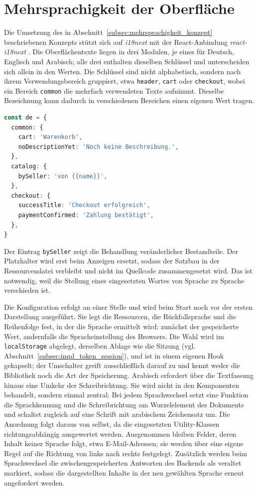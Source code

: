 \section{Mehrsprachigkeit der Oberfläche}
\label{sec:impl_i18n}

Die Umsetzung des in
Abschnitt~\ref{subsec:mehrsprachigkeit_konzept} beschriebenen
Konzepts stützt sich auf \textit{i18next} mit der React-Anbindung
\textit{react-i18next} \cite{i18next_docs}. Die Oberflächentexte liegen in drei Modulen, je eines für Deutsch,
Englisch und Arabisch; alle drei enthalten dieselben Schlüssel und unterscheiden sich allein in den
Werten. Die Schlüssel sind nicht alphabetisch, sondern nach ihrem
Verwendungsbereich gruppiert, etwa \texttt{header}, \texttt{cart}
oder \texttt{checkout}, wobei ein Bereich \texttt{common} die
mehrfach verwendeten Texte aufnimmt. Dieselbe Bezeichnung kann
dadurch in verschiedenen Bereichen einen eigenen Wert tragen.

\begin{lstlisting}[language=TypeScript,caption={Auszug aus der deutschen Ressourcendatei (de.ts)},label={lst:i18n-messages}]
const de = {
  common: {
    cart: 'Warenkorb',
    noDescriptionYet: 'Noch keine Beschreibung.',
  },
  catalog: {
    bySeller: 'von {{name}}',
  },
  checkout: {
    successTitle: 'Checkout erfolgreich',
    paymentConfirmed: 'Zahlung bestätigt',
  },
}
\end{lstlisting}

Der Eintrag \texttt{bySeller} zeigt die Behandlung veränderlicher
Bestandteile. Der Platzhalter wird erst beim Anzeigen ersetzt, sodass
der Satzbau in der Ressourcendatei verbleibt und nicht im Quellcode
zusammengesetzt wird. Das ist notwendig, weil die Stellung eines
eingesetzten Wortes von Sprache zu Sprache verschieden ist.

Die Konfiguration erfolgt an einer Stelle und wird beim Start noch
vor der ersten Darstellung ausgeführt. Sie legt die Ressourcen, die
Rückfallsprache und die Reihenfolge fest, in der die Sprache
ermittelt wird: zunächst der gespeicherte Wert, andernfalls die
Spracheinstellung des Browsers. Die Wahl wird im
\texttt{localStorage} abgelegt, derselben Ablage wie die Sitzung
(vgl. Abschnitt~\ref{subsec:impl_token_session}), und ist in einem
eigenen Hook gekapselt; der Umschalter greift ausschließlich darauf
zu und kennt weder die Bibliothek noch die Art der Speicherung.
Arabisch erfordert über die Textfassung hinaus eine Umkehr der
Schreibrichtung. Sie wird nicht in den Komponenten behandelt, sondern
einmal zentral: Bei jedem Sprachwechsel setzt eine Funktion die
Sprachkennung und die Schreibrichtung am Wurzelelement des Dokuments
und schaltet zugleich auf eine Schrift mit arabischem Zeichensatz um.
Die Anordnung folgt daraus von selbst, da die eingesetzten
Utility-Klassen richtungsabhängig ausgewertet werden. Ausgenommen
bleiben Felder, deren Inhalt keiner Sprache folgt, etwa
E-Mail-Adressen; sie werden über eine eigene Regel auf die Richtung
von links nach rechts festgelegt. Zusätzlich werden beim Sprachwechsel
die zwischengespeicherten Antworten des Backends als veraltet
markiert, sodass die dargestellten Inhalte in der neu gewählten
Sprache erneut angefordert werden.

